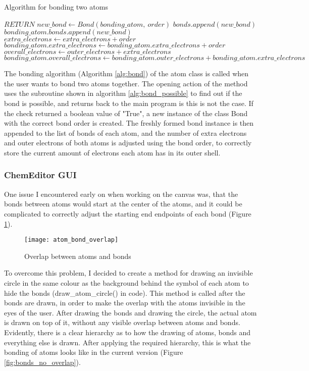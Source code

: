 \documentclass[a4paper,12pt]{article}
\begin{document}
\begin{algorithm}
\footnotesize
\caption{Algorithm for bonding two atoms}\label{alg:bond}
\begin{algorithmic}
	\State $ RETURN$
\EndIf
\State $ new\_bond\gets Bond(bonding\_atom,\ order)$
\State $ bonds.append(new\_bond)$
\State $ bonding\_atom.bonds.append(new\_bond)$
\State $ extra\_electrons\gets extra\_electrons + order$
\State $ bonding\_atom.extra\_electrons\gets bonding\_atom.extra\_electrons + order$
\State $ overall\_electrons\gets outer\_electrons + extra\_electrons$
\State $ bonding\_atom.overall\_electrons\gets bonding\_atom.outer\_electrons + bonding\_atom.extra\_electrons$
\EndFunction
\end{algorithmic}
\end{algorithm}

The bonding algorithm (Algorithm \ref{alg:bond}) of the atom class is called when the user wants to bond two atoms together. The opening action of the method uses the subroutine shown in algorithm \ref{alg:bond_possible} to find out if the bond is possible, and returns back to the main program is this is not the case. If the check returned a boolean value of "True", a new instance of the class Bond with the correct bond order is created. The freshly formed bond instance is then appended to the list of bonds of each atom, and the number of extra electrons and outer electrons of both atoms is adjusted using the bond order, to correctly store the current amount of electrons each atom has in its outer shell.

\newpage

\subsubsection{ChemEditor GUI}

One issue I encountered early on when working on the canvas was, that the bonds between atoms would start at the center of the atoms, and it could be complicated to correctly adjust the starting end endpoints of each bond (Figure \ref{fig:atom_bond_overlap}).

\begin{figure} [h]
	\centering
	\texttt{[image: atom\_bond\_overlap]}
	\caption{Overlap between atoms and bonds}
	\label{fig:atom_bond_overlap}
\end{figure}

To overcome this problem, I decided to create a method for drawing an invisible circle in the same colour as the background behind the symbol of each atom to hide the bonds (draw\_atom\_circle() in code). This method is called after the bonds are drawn, in order to make the overlap with the atoms invisible in the eyes of the user. After drawing the bonds and drawing the circle, the actual atom is drawn on top of it, without any visible overlap between atoms and bonds. Evidently, there is a clear hierarchy as to how the drawing of atoms, bonds and everything else is drawn. After applying the required hierarchy, this is what the bonding of atoms looks like in the current version (Figure \ref{fig:bonds_no_overlap}).
\end{document}
